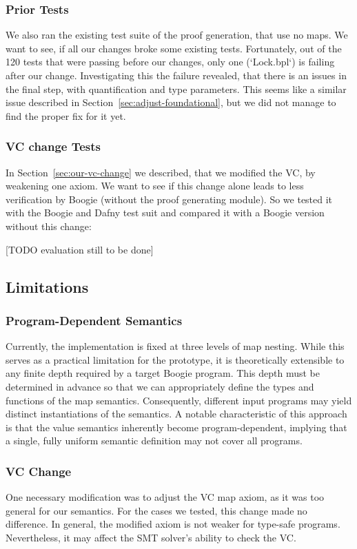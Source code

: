 \documentclass[11pt]{article}
\begin{document}
\subsubsection{Prior Tests}
We also ran the existing test suite of the proof generation, that use no maps.
We want to see, if all our changes broke some existing tests.
Fortunately, out of the 120 tests that were passing before our changes,
only one (`Lock.bpl`) is failing after our change.
Investigating this the failure revealed, that there is an issues in the final step,
with quantification and type parameters.
This seems like a similar issue described in Section~\ref{sec:adjust-foundational},
but we did not manage to find the proper fix for it yet.


\subsubsection{VC change Tests}
In Section~\ref{sec:our-vc-change} we described, that we modified the VC,
by weakening one axiom.
We want to see if this change alone leads to less verification by Boogie
(without the proof generating module).
So we tested it with the Boogie and Dafny test suit and compared it
with a Boogie version without this change:

[TODO evaluation still to be done]


\subsection{Limitations}
\label{sec:limitations}

\subsubsection{Program-Dependent Semantics}
Currently, the implementation is fixed at three levels of map nesting.
While this serves as a practical limitation for the prototype,
it is theoretically extensible to any finite depth required by a target Boogie program.
This depth must be determined in advance so that we can appropriately define the types and functions of the map semantics.
Consequently, different input programs may yield distinct instantiations of the semantics.
A notable characteristic of this approach is that the value semantics inherently become program-dependent,
implying that a single, fully uniform semantic definition may not cover all programs.


\subsubsection{VC Change}
One necessary modification was to adjust the VC map axiom,
as it was too general for our semantics.
For the cases we tested, this change made no difference.
In general, the modified axiom is not weaker for type-safe programs.
Nevertheless, it may affect the SMT solver's ability to check the VC.
\end{document}
